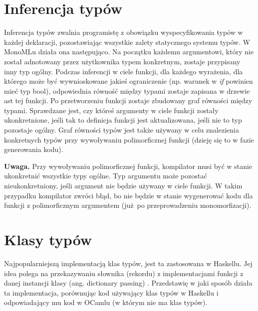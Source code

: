 \documentclass[declaration,shortabstract]{iithesis}
\begin{document}


\section{Inferencja typów}

Inferencja typów zwalnia programistę z obowiązku wyspecyfikowania typów w
każdej deklaracji, pozostawiając wszystkie zalety statycznego systemu typów.
W MonoMLu działa ona następująco. Na początku każdemu argumentowi,
który nie został adnotowany przez użytkownika typem konkretnym, zostaje 
przypisany inny typ ogólny. Podczas inferencji w ciele funkcji, dla 
każdego wyrażenia, dla którego może być wywnioskowane jakieś ograniczenie 
(np. warunek w \textit{if} powinien mieć typ bool), odpowiednia 
równość między typami zostaje zapisana w drzewie ast tej funkcji. Po 
przetworzeniu funkcji zostaje zbudowany graf równości między typami. 
Sprawdzane jest, czy któreś argumenty w ciele funkcji zostały ukonkretnione, 
jeśli tak to definicja funkcji jest aktualizowana, jeśli nie to typ pozostaje
ogólny. Graf równości typów jest także używany w celu znalezienia konkretnych 
typów przy wywoływaniu polimorficznej funkcji (dzieję się to w fazie 
generowania kodu). 

\textbf{Uwaga.} Przy wywoływaniu polimorficznej funkcji, kompilator 
musi być w stanie ukonkretnić wszystkie typy ogólne. Typ argumentu może pozostać 
nieukonkretniony, jeśli argument nie będzie używany w ciele funkcji. W takim 
przypadku kompilator zwróci błąd, bo nie będzie w stanie wygenerować kodu dla 
funkcji z polimorficznym argumentem (już po przeprowadzeniu monomorfizacji).


\section{Klasy typów}
Najpopularniejszą implementacją klas typów, jest ta zastosowana w Haskellu. 
Jej idea polega na przekazywaniu słownika (rekordu) z implementacjami funkcji 
z danej instancji klasy (ang. dictionary passing) 
\cite{implementing_type_classes, type_class_wadler88}. Przedstawię w jaki sposób 
działa ta implementacja, porównując kod używający klas typów w Haskellu i 
odpowiadający mu kod w OCamlu (w którym nie ma klas typów).
\end{document}
